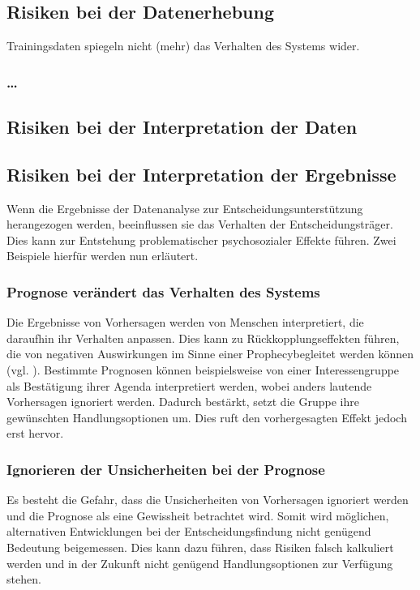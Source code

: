 \subsection{Risiken bei der Datenerhebung}

Trainingsdaten spiegeln nicht (mehr) das Verhalten des Systems wider.

\subsubsection{\ldots}

\subsection{Risiken bei der Interpretation der Daten}

\subsection{Risiken bei der Interpretation der Ergebnisse}

Wenn die Ergebnisse der Datenanalyse zur Entscheidungsunterstützung herangezogen
werden, beeinflussen sie das Verhalten der Entscheidungsträger. Dies kann zur
Entstehung problematischer psychosozialer Effekte führen. Zwei Beispiele hierfür
werden nun erläutert.

\subsubsection{Prognose verändert das Verhalten des Systems }

Die Ergebnisse von Vorhersagen werden von Menschen interpretiert,
die daraufhin ihr Verhalten anpassen. Dies kann zu Rückkopplungseffekten führen,
die von negativen Auswirkungen im Sinne einer
 Prophecy\grqq begleitet werden können
(vgl. \cite{Crossman}). Bestimmte Prognosen können beispielsweise von einer 
Interessengruppe als Bestätigung ihrer Agenda interpretiert werden, wobei
anders lautende Vorhersagen ignoriert werden. Dadurch bestärkt, setzt die Gruppe
ihre gewünschten Handlungsoptionen um. Dies ruft den vorhergesagten Effekt
jedoch erst hervor.

\subsubsection{Ignorieren der Unsicherheiten bei der Prognose}

Es besteht die Gefahr, dass die Unsicherheiten von Vorhersagen ignoriert werden
und die Prognose als eine Gewissheit betrachtet wird. Somit wird möglichen,
alternativen Entwicklungen bei der Entscheidungsfindung nicht genügend Bedeutung
beigemessen. Dies kann dazu führen, dass Risiken falsch kalkuliert werden und
in der Zukunft nicht genügend Handlungsoptionen zur Verfügung stehen.
